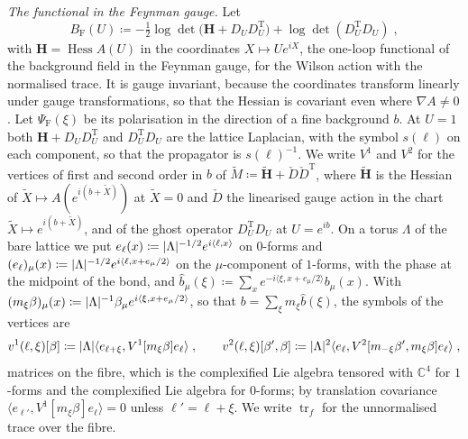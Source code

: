 \documentclass[11pt]{preprint}
\DeclarePairedDelimiter{\abs}{\lvert}{\rvert}
\numberwithin{equation}{section}
\theoremstyle{definition}
\theoremstyle{remark}
\theoremstyle{plain}
\begin{document}
\emph{The functional in the Feynman gauge.} Let
\begin{equation}\label{eq:feynman-functional}
    B_{\mathrm F}(U) \coloneqq -\tfrac12\log\det\bigl(\mathbf H + D_UD_U^{\mathrm T}\bigr) + \log\det(D_U^{\mathrm T}D_U)\;,
\end{equation}
with $\mathbf H = \operatorname{Hess}A(U)$ in the coordinates $X \mapsto Ue^{iX}$, the one-loop functional of the background field in the Feynman gauge, for the Wilson action with the normalised trace. It is gauge invariant, because the coordinates transform linearly under gauge transformations, so that the Hessian is covariant even where $\nabla A \neq 0$. Let $\Psi_{\mathrm F}(\xi)$ be its polarisation in the direction of a fine background $b$. At $U = 1$ both $\mathbf H + D_UD_U^{\mathrm T}$ and $D_U^{\mathrm T}D_U$ are the lattice Laplacian, with the symbol $s(\ell)$ on each component, so that the propagator is $s(\ell)^{-1}$. We write $V^1$ and $V^2$ for the vertices of first and second order in $b$ of $\tilde M \coloneqq \tilde{\mathbf H} + \check D\check D^{\mathrm T}$, where $\tilde{\mathbf H}$ is the Hessian of $\tilde X \mapsto A(e^{i(b+\tilde X)})$ at $\tilde X = 0$ and $\check D$ the linearised gauge action in the chart $\tilde X \mapsto e^{i(b+\tilde X)}$, and of the ghost operator $D_U^{\mathrm T}D_U$ at $U = e^{ib}$. On a torus $\Lambda$ of the bare lattice we put $e_\ell(x) \coloneqq \abs{\Lambda}^{-1/2}e^{i\langle\ell, x\rangle}$ on $0$-forms and $(e_\ell)_\mu(x) \coloneqq \abs{\Lambda}^{-1/2}e^{i\langle\ell, x + e_\mu/2\rangle}$ on the $\mu$-component of $1$-forms, with the phase at the midpoint of the bond, and $\hat b_\mu(\xi) \coloneqq \sum_xe^{-i\langle\xi, x + e_\mu/2\rangle}b_\mu(x)$. With $(m_\xi\beta)_\mu(x) \coloneqq \abs{\Lambda}^{-1}\beta_\mu e^{i\langle\xi, x + e_\mu/2\rangle}$, so that $b = \sum_\xi m_\xi\hat b(\xi)$, the symbols of the vertices are
\begin{equation}\label{eq:vertex-symbols}
    v^1(\ell, \xi)[\beta] \coloneqq \abs{\Lambda}\langle e_{\ell+\xi}, V^1[m_\xi\beta]e_\ell \rangle\;,
    \qquad
    v^2(\ell, \xi)[\beta', \beta] \coloneqq \abs{\Lambda}^2\langle e_\ell, V^2[m_{-\xi}\beta', m_\xi\beta]e_\ell \rangle\;,
\end{equation}
matrices on the fibre, which is the complexified Lie algebra tensored with $\mathbb C^4$ for $1$-forms and the complexified Lie algebra for $0$-forms; by translation covariance $\langle e_{\ell'}, V^1[m_\xi\beta]e_\ell \rangle = 0$ unless $\ell' = \ell + \xi$. We write $\operatorname{tr}_f$ for the unnormalised trace over the fibre.
\end{document}
